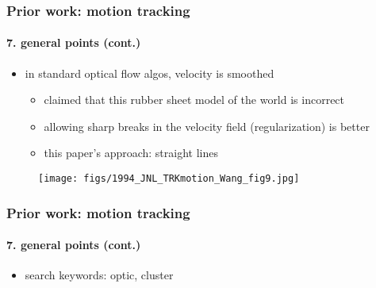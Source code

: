 \begin{frame}
\frametitle{Prior work: motion tracking}
\framesubtitle{7. general points (cont.)}
\mypagenum
{}
	\begin{itemize}
		\item in standard optical flow algos, velocity is smoothed
			\begin{itemize}
				\item claimed that this {\color{blue}rubber sheet model} of the world is incorrect
				\item allowing sharp breaks in the velocity field (regularization) is better
				\item this paper's approach: straight lines
			\end{itemize}
	\end{itemize}
	\begin{figure}
		\texttt{[image: figs/1994\_JNL\_TRKmotion\_Wang\_fig9.jpg]}
	\end{figure}
\end{frame}


\begin{frame}
\frametitle{Prior work: motion tracking}
\framesubtitle{7. general points (cont.)}
\mypagenum
{}
	\begin{itemize}
		\item search keywords: optic, cluster
	\end{itemize}
\end{frame}




\printbibliography

